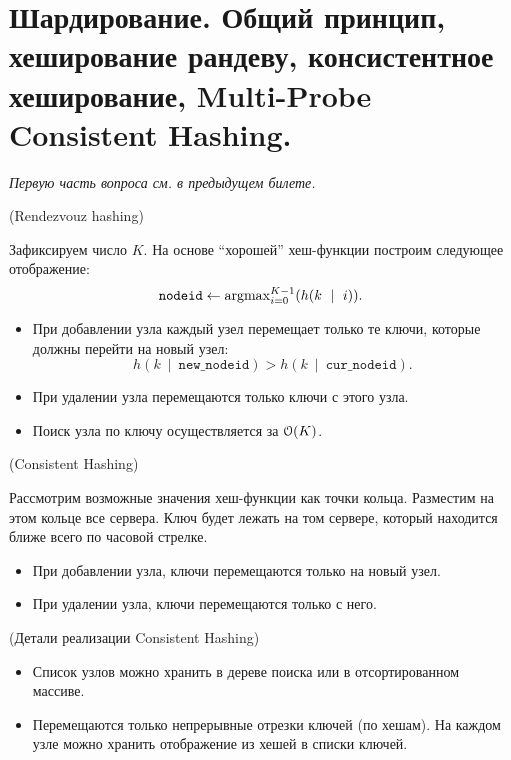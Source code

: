 \section{Шардирование. Общий принцип, хеширование рандеву, консистентное 
хеширование, Multi-Probe Consistent Hashing.}

\textit{Первую часть вопроса см. в предыдущем билете.}

\begin{algorithm}(Rendezvouz hashing)
    
    Зафиксируем число $K$. На основе ``хорошей'' хеш-функции построим
    следующее отображение:
    \[
        \texttt{nodeid} \leftarrow \operatorname{argmax}_{i = 0}^{K - 1}(h(k~\mid~i))
    .\]
    \begin{itemize}
        \item При добавлении узла каждый узел перемещает только те ключи,
            которые должны перейти на новый узел:
            \[
                h(k~\mid~\texttt{new\_nodeid}) > h(k~\mid~\texttt{cur\_nodeid})
            .\]
        \item При удалении узла перемещаются только ключи с этого узла.
        \item Поиск узла по ключу осуществляется за $\mathcal{O}(K)$.
    \end{itemize}
\end{algorithm} 

\begin{algorithm}(Consistent Hashing)
    
    Рассмотрим возможные значения хеш-функции как точки кольца. Разместим на этом
    кольце все сервера. Ключ будет лежать на том сервере, который находится ближе всего
    по часовой стрелке. 
    \begin{itemize}
        \item При добавлении узла, ключи перемещаются только на новый узел.
        \item При удалении узла, ключи перемещаются только с него.
    \end{itemize}
\end{algorithm}

\begin{remark}(Детали реализации Consistent Hashing)
    \enewline
    \begin{itemize}
        \item Список узлов можно хранить в дереве поиска или в отсортированном массиве.
        \item Перемещаются только непрерывные отрезки ключей (по хешам). На каждом
            узле можно хранить отображение из хешей в списки ключей.
    \end{itemize}
\end{remark}

